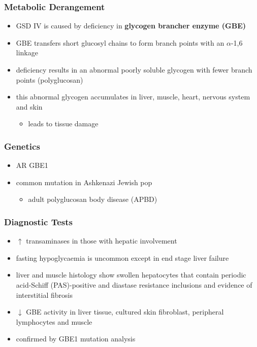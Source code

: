\documentclass[12pt]{scrartcl}
\begin{document}
\subsubsection{Metabolic Derangement}
\label{sec:orgc524c2d}
\begin{itemize}
\item GSD IV is caused by deficiency in \textbf{glycogen brancher enzyme (GBE)}
\item GBE transfers short glucosyl chains to form branch points with an
\(\alpha\)-1,6 linkage
\item deficiency results in an abnormal poorly soluble glycogen with fewer branch points (polyglucosan)
\item this abnormal glycogen accumulates in liver, muscle, heart, nervous system and skin
\begin{itemize}
\item leads to tissue damage
\end{itemize}
\end{itemize}

\subsubsection{Genetics}
\label{sec:org571b4ff}
\begin{itemize}
\item AR GBE1
\item common mutation in Ashkenazi Jewish pop
\begin{itemize}
\item adult polyglucosan body disease (APBD)
\end{itemize}
\end{itemize}

\subsubsection{Diagnostic Tests}
\label{sec:org26ffd0c}

\begin{itemize}
\item \(\uparrow\) transaminases in those with hepatic involvement
\item fasting hypoglycaemia is uncommon except in end stage liver failure
\item liver and muscle histology show swollen hepatocytes that contain
periodic acid-Schiff (PAS)-positive and diastase resistance
inclusions and evidence of interstitial fibrosis
\item \(\downarrow\) GBE activity in liver tissue, cultured skin fibroblast,
peripheral lymphocytes and muscle
\item confirmed by GBE1 mutation analysis
\end{itemize}
\end{document}
